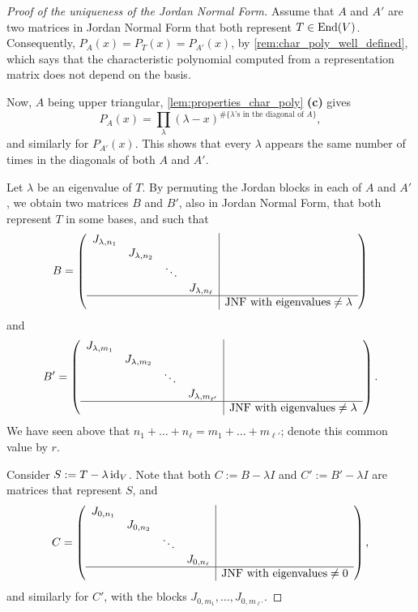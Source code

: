 \begin{proof}[Proof of the uniqueness of the Jordan Normal Form]
Assume that $A$ and $A'$ are two matrices in Jordan Normal Form that both represent $T \in \operatorname{End}(V)$. Consequently, $P_A(x) = P_T(x) = P_{A'}(x)$, by \cref{rem:char_poly_well_defined}, which says that the characteristic polynomial computed from a representation matrix does not depend on the basis.

Now, $A$ being upper triangular, \cref{lem:properties_char_poly} \textbf{(c)} gives
\[
    P_A(x) = \prod_{\lambda} (\lambda - x)^{\#\{\lambda\text{'s in the diagonal of } A\}},
\]
and similarly for $P_{A'}(x)$. This shows that every $\lambda$ appears the same number of times in the diagonals of both $A$ and $A'$.

Let $\lambda$ be an eigenvalue of $T$. By permuting the Jordan blocks in each of $A$ and $A'$, we obtain two matrices $B$ and $B'$, also in Jordan Normal Form, that both represent $T$ in some bases, and such that
\[
    B = \left(\begin{array}{cccc|c} J_{\lambda, n_1} & & & & \\ & J_{\lambda, n_2} & & & \\ & & \ddots & & \\ & & & J_{\lambda, n_\ell} & \\ \hline & & & & \text{JNF with eigenvalues} \neq \lambda \end{array}\right)
\]
and
\[
    B' = \left(\begin{array}{cccc|c} J_{\lambda, m_1} & & & & \\ & J_{\lambda, m_2} & & & \\ & & \ddots & & \\ & & & J_{\lambda, m_{\ell'}} & \\ \hline & & & & \text{JNF with eigenvalues} \neq \lambda \end{array}\right).
\]
We have seen above that $n_1 + \dots + n_\ell = m_1 + \dots + m_{\ell'}$; denote this common value by $r$.

Consider $S := T - \lambda \operatorname{id}_V$. Note that both $C := B - \lambda I$ and $C' := B' - \lambda I$ are matrices that represent $S$, and
\[
    C = \left(\begin{array}{cccc|c} J_{0, n_1} & & & & \\ & J_{0, n_2} & & & \\ & & \ddots & & \\ & & & J_{0, n_\ell} & \\ \hline & & & & \text{JNF with eigenvalues} \neq 0 \end{array}\right),
\]
and similarly for $C'$, with the blocks $J_{0,m_1}, \dots, J_{0,m_{\ell'}}$.


\end{proof}
